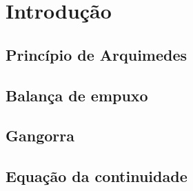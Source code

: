 \section{Introdução}
\subsection{Princípio de Arquimedes}


\subsection{Balança de empuxo}


\subsection{Gangorra}


\subsection{Equação da continuidade}


